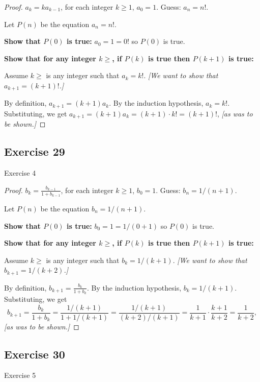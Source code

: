\documentclass[14pt]{extarticle}
\newcommand{\dps}{\displaystyle}
\begin{document}
\begin{proof}
\(a_k = ka_{k-1}\), for each integer \(k \geq 1\), \(a_0 = 1\). Guess: \(a_n = n!\).

Let $P(n)$ be the equation \(a_n = n!\).

{\bf Show that \(P(0)\) is true:} \(a_0 = 1 = 0!\) so $P(0)$ is true.

{\bf Show that for any integer \(k \geq \), if \(P(k)\) is true then \(P(k+1)\) is true:}

Assume \(k \geq \) is any integer such that \(a_k = k!\). {\it [We want to show that \(a_{k+1} = (k+1)!\).]}

By definition, \(a_{k+1} = (k+1)a_k\). 
By the induction hypothesis, \(a_k = k!\). 
Substituting, we get \(a_{k+1} = (k+1)a_k = (k+1) \cdot k! = (k+1)!\), {\it [as was to be shown.]}
\end{proof}

\subsection{Exercise 29}
Exercise 4

\begin{proof}
\(b_k = \dps \frac{b_{k-1}}{1 + b_{k-1}}\), for each integer \(k \geq 1\), \(b_0 = 1\). Guess: \(b_n = 1/(n+1)\).

Let $P(n)$ be the equation \(b_n = 1/(n+1)\).

{\bf Show that \(P(0)\) is true:} \(b_0 = 1 = 1 / (0+1)\) so $P(0)$ is true.

{\bf Show that for any integer \(k \geq \), if \(P(k)\) is true then \(P(k+1)\) is true:}

Assume \(k \geq \) is any integer such that \(b_k = 1/(k+1)\). {\it [We want to show that \(b_{k+1} = 1/(k+2)\).]}

By definition, \(b_{k+1} = \dps \frac{b_k}{1 + b_k}\).
By the induction hypothesis, \(b_k = 1/(k+1)\).
Substituting, we get 
\[
b_{k+1} = \dps \frac{b_k}{1 + b_k} = \frac{1/(k+1)}{1 + 1/(k+1)} = \frac{1/(k+1)}{(k+2)/(k+1)} = \frac{1}{k+1} \cdot \frac{k+1}{k+2} = \frac{1}{k+2},
\] 
{\it [as was to be shown.]}
\end{proof}

\subsection{Exercise 30}
Exercise 5
\end{document}
